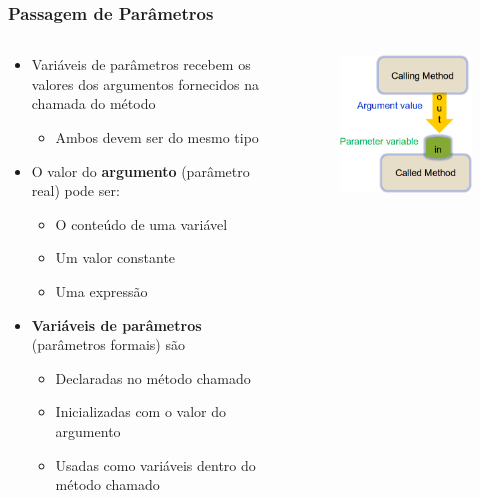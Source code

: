 \documentclass[xcolor={dvipsnames,table},aspectratio=169]{beamer}
\begin{document}
\begin{frame}\frametitle{Passagem de Parâmetros}
\begin{columns}[T]
	\begin{column}{0.7\linewidth}
\begin{itemize}
	\item Variáveis de parâmetros recebem os valores dos argumentos fornecidos na chamada do método
	\begin{itemize}
		\item Ambos devem ser do mesmo tipo
	\end{itemize}
	\item O valor do \textbf{argumento} (parâmetro real) pode ser:
	\begin{itemize}
		\item O conteúdo de uma variável
		\item Um valor constante
		\item Uma expressão
	\end{itemize}
	\item \textbf{Variáveis de parâmetros} (parâmetros formais) são
	\begin{itemize}
		\item Declaradas no método chamado
		\item Inicializadas com o valor do argumento
		\item Usadas como variáveis dentro do método chamado
	\end{itemize}
\end{itemize}
	\end{column}
	\begin{column}{0.3\linewidth}
\begin{figure}[h]
	\includegraphics[height=0.5\paperheight,center]{pucrs-ep-fprog-unidade_05-metodos-laminas-passagem_de_parametros.png}
\end{figure}
	\end{column}
\end{columns}
\end{frame}
\end{document}
